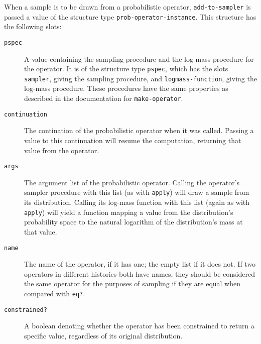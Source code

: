 \documentclass{article}
\begin{document}
When a sample is to be drawn from a probabilistic
operator, \texttt{add-to-sampler} is passed a value of the structure
type \texttt{prob-operator-instance}. This structure has the
following slots:

\begin{description}

  \item[\texttt{pspec}] \hfill

    A value containing the sampling procedure and the log-mass
    procedure for the operator. It is of the structure type
    \texttt{pspec}, which has the slots \texttt{sampler}, giving the
    sampling procedure, and \texttt{logmass-function}, giving the
    log-mass procedure. These procedures have the same properties as
    described in the documentation for \texttt{make-operator}.

  \item[\texttt{continuation}] \hfill

    The contination of the probabilistic operator when it was
    called. Passing a value to this continuation will resume the
    computation, returning that value from the operator.

  \item[\texttt{args}] \hfill

    The argument list of the probabilistic operator. Calling the
    operator's sampler procedure with this list (as with
    \texttt{apply}) will draw a sample from its distribution. Calling
    its log-mass function with this list (again as with
    \texttt{apply}) will yield a function mapping a value from the
    distribution's probability space to the natural logarithm of the
    distribution's mass at that value.

  \item[\texttt{name}] \hfill

    The name of the operator, if it has one; the empty list if it does
    not. If two operators in different histories both have names, they
    should be considered the same operator for the purposes of
    sampling if they are equal when compared with \texttt{eq?}.

  \item[\texttt{constrained?}] \hfill

    A boolean denoting whether the operator has been constrained to
    return a specific value, regardless of its original distribution.

\end{description}
\end{document}
